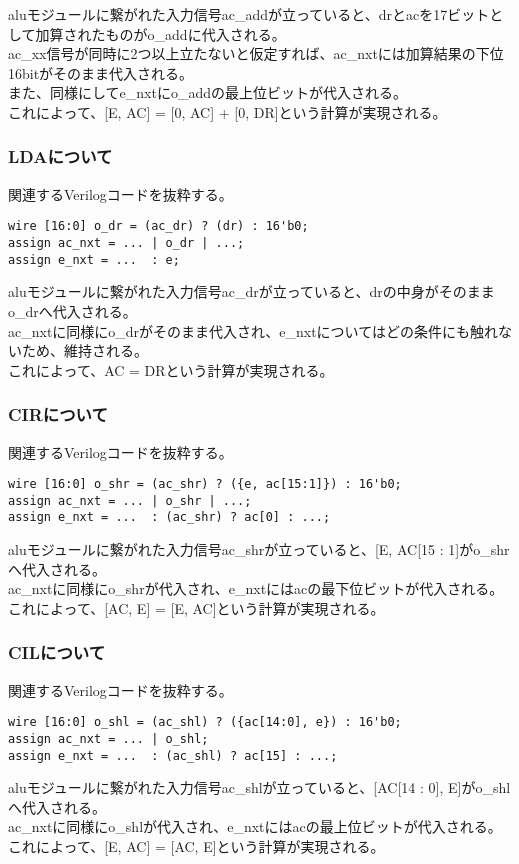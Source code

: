 \documentclass{jsarticle}
\begin{document}
aluモジュールに繋がれた入力信号ac\_addが立っていると、drとacを17ビットとして加算されたものがo\_addに代入される。\\
ac\_xx信号が同時に2つ以上立たないと仮定すれば、ac\_nxtには加算結果の下位16bitがそのまま代入される。\\
また、同様にしてe\_nxtにo\_addの最上位ビットが代入される。\\
これによって、[E, AC] = [0, AC] + [0, DR]という計算が実現される。\\

\subsubsection*{LDAについて}
関連するVerilogコードを抜粋する。
\begin{lstlisting}
wire [16:0] o_dr = (ac_dr) ? (dr) : 16'b0;
assign ac_nxt = ... | o_dr | ...;
assign e_nxt = ...  : e;
\end{lstlisting}
aluモジュールに繋がれた入力信号ac\_drが立っていると、drの中身がそのままo\_drへ代入される。\\
ac\_nxtに同様にo\_drがそのまま代入され、e\_nxtについてはどの条件にも触れないため、維持される。\\
これによって、AC = DRという計算が実現される。

\subsubsection*{CIRについて}
関連するVerilogコードを抜粋する。
\begin{lstlisting}
wire [16:0] o_shr = (ac_shr) ? ({e, ac[15:1]}) : 16'b0;
assign ac_nxt = ... | o_shr | ...;
assign e_nxt = ...  : (ac_shr) ? ac[0] : ...;
\end{lstlisting}
aluモジュールに繋がれた入力信号ac\_shrが立っていると、[E, AC[15 : 1]がo\_shrへ代入される。\\
ac\_nxtに同様にo\_shrが代入され、e\_nxtにはacの最下位ビットが代入される。\\
これによって、[AC, E] = [E, AC]という計算が実現される。

\subsubsection*{CILについて}
関連するVerilogコードを抜粋する。
\begin{lstlisting}
wire [16:0] o_shl = (ac_shl) ? ({ac[14:0], e}) : 16'b0;
assign ac_nxt = ... | o_shl;
assign e_nxt = ...  : (ac_shl) ? ac[15] : ...;
\end{lstlisting}
aluモジュールに繋がれた入力信号ac\_shlが立っていると、[AC[14 : 0], E]がo\_shlへ代入される。\\
ac\_nxtに同様にo\_shlが代入され、e\_nxtにはacの最上位ビットが代入される。\\
これによって、[E, AC] = [AC, E]という計算が実現される。
\end{document}
